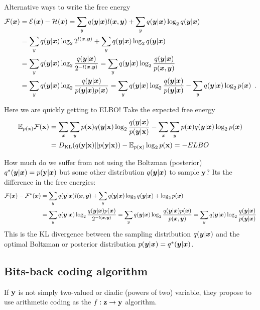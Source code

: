 \begin{notebox}
Alternative ways to write the free energy
\begin{align*}
\mathcal{F}({\bm{x}}) & = \mathcal{E}({\bm{x}}) - \mathcal{H}({\bm{x}})
= \sum_y q({\bm{y}} | {\bm{x}}) l({\bm{x}}, {\bm{y}}) + \sum_y q({\bm{y}} | {\bm{x}}) \log_2 q({\bm{y}} | {\bm{x}}) \\
& = \sum_y q({\bm{y}} | {\bm{x}}) \log_2 2^{l({\bm{x}}, {\bm{y}})} + \sum_y q({\bm{y}} | {\bm{x}}) \log_2 q({\bm{y}} | {\bm{x}}) \\
& = \sum_y q({\bm{y}} | {\bm{x}}) \log_2 \frac{ q({\bm{y}} | {\bm{x}})}{2^{-l({\bm{x}}, {\bm{y}})}}
= \sum_y q({\bm{y}} | {\bm{x}}) \log_2 \frac{ q({\bm{y}} | {\bm{x}})}{p({\bm{x}}, {\bm{y}})} \\
& = \sum_y q({\bm{y}} | {\bm{x}}) \log_2 \frac{ q({\bm{y}} | {\bm{x}})}{p({\bm{y}} | {\bm{x}}) p({\bm{x}})} 
= \sum_y q({\bm{y}} | {\bm{x}}) \log_2 \frac{ q({\bm{y}} | {\bm{x}})}{p({\bm{y}} | {\bm{x}})}
- \sum_y q({\bm{y}} | {\bm{x}}) \log_2 p({\bm{x}})
\enspace .
\end{align*}

Here we are quickly getting to ELBO!
Take the expected free energy
\begin{align}
\mathbb{E}_{p({\mathbf{x}})} \mathcal{F}({\mathbf{x}})
& = \sum_x \sum_y p({\mathbf{x}}) q({\bm{y}} | {\mathbf{x}}) \log_2 \frac{ q({\bm{y}} | {\bm{x}})}{p({\bm{y}} | {\mathbf{x}})}
- \sum_x \sum_y p({\bm{x}}) q({\bm{y}} | {\bm{x}}) \log_2 p({\bm{x}}) \nonumber \\
& = D_{\mathrm{KL}}(q({\mathbf{y}} | {\mathbf{x}}) || p({\mathbf{y}} | {\mathbf{x}})) - \mathbb{E}_{p({\mathbf{x}})} \log_2 p({\mathbf{x}}) = - ELBO
\end{align}

\end{notebox}

How much do we suffer from not using the Boltzman (posterior) $q^*({\bm{y}} | {\bm{x}}) = p({\mathbf{y}}| {\bm{x}})$ but some other distribution $q({\bm{y}} | {\bm{x}})$ to sample ${\mathbf{y}}$? 
Its the difference in the free energies:
\begin{align*}
\mathcal{F}({\bm{x}}) - \mathcal{F^*}({\bm{x}}) 
& = \sum_y q({\bm{y}} | {\bm{x}}) l({\bm{x}}, {\bm{y}}) + \sum_y q({\bm{y}} | {\bm{x}}) \log_2 q({\bm{y}} | {\bm{x}}) + \log_2 p({\bm{x}}) \nonumber \\
& = \sum_y q({\bm{y}} | {\bm{x}}) \log_2 \frac{q({\bm{y}} | {\bm{x}}) p({\bm{x}})}{2^{-l({\bm{x}}, {\bm{y}})}}
= \sum_y q({\bm{y}} | {\bm{x}}) \log_2 \frac{q({\bm{y}} | {\bm{x}}) p({\bm{x}})}{p({\bm{x}}, {\bm{y}})}
= \sum_y q({\bm{y}} | {\bm{x}}) \log_2 \frac{q({\bm{y}} | {\bm{x}})}{p({\bm{y}} | {\bm{x}})}
\end{align*}
This is the KL divergence between the sampling distribution $q({\bm{y}} | {\bm{x}})$ and the optimal Boltzman or posterior distribution $p({\bm{y}} | {\bm{x}}) = q^*({\bm{y}} | {\bm{x}})$.


\subsection{Bits-back coding algorithm}

If ${\mathbf{y}}$ is not simply two-valued or diadic (powers of two) variable, they propose to use arithmetic coding as the $f : {\mathbf{z}} \to {\mathbf{y}}$ algorithm.

